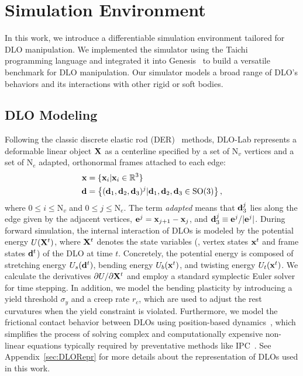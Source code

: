\section{Simulation Environment}
In this work, we introduce a differentiable simulation environment tailored for DLO manipulation. We implemented the simulator using the Taichi~\citep{hu2019taichi,hu2020difftaichi} programming language and integrated it into Genesis~\citep{Genesis} to build a versatile benchmark for DLO manipulation. Our simulator models a broad range of DLO's behaviors and its interactions with other rigid or soft bodies.

\subsection{DLO Modeling}
Following the classic discrete elastic rod (DER)~\citep{bergou2008discrete, bergou2010discrete} methods, DLO-Lab represents a deformable linear object ${\mathbf{X}}$ as a centerline specified by a set of $\text{N}_v$ vertices and a set of $\text{N}_e$ adapted, orthonormal frames attached to each edge:
\begin{align}
\begin{split}
    {\mathbf{x}} &= \{{\mathbf{x}}_i|{\mathbf{x}}_i\in{\mathbb{R}}^3\}\\
    {\mathbf{d}} &= 
    \left\{({\mathbf{d}}_1, {\mathbf{d}}_2, {\mathbf{d}}_3)^j| {\mathbf{d}}_1, {\mathbf{d}}_2, {\mathbf{d}}_3 \in \mathrm{SO(3)}\right\},
\end{split}
\end{align}
where $0\leq i\leq \text{N}_v$ and $0 \leq j \leq \text{N}_e$. The term \emph{adapted} means that ${\mathbf{d}}^j_3$ lies along the edge given by the adjacent vertices, ${\mathbf{e}}^j={\mathbf{x}}_{j+1}-{\mathbf{x}}_j$, and ${\mathbf{d}}^j_3\equiv{\mathbf{e}}^j/|{\mathbf{e}}^j|$.
During forward simulation, the internal interaction of DLOs is modeled by the potential energy $U({\mathbf{X}}^t)$, where ${\mathbf{X}}^t$ denotes the state variables (\ie, vertex states ${\mathbf{x}}^t$ and frame states ${\mathbf{d}}^t$) of the DLO at time $t$. Concretely, the potential energy is composed of stretching energy $U_s({\mathbf{d}}^t)$, bending energy $U_b({\mathbf{x}}^t)$, and twisting energy $U_t({\mathbf{x}}^t)$. We calculate the derivatives $\partial U/\partial {\mathbf{X}}^t$ and employ a standard symplectic Euler solver for time stepping. In addition, we model the bending plasticity by introducing a yield threshold $\sigma_y$ and a creep rate $r_c$, which are used to adjust the rest curvatures when the yield constraint is violated. Furthermore, we model the frictional contact behavior between DLOs using position-based dynamics~\citep{muller2007position}, which simplifies the process of solving complex and computationally expensive non-linear equations typically required by preventative methods like IPC~\citep{li2020incremental,li2021codimensional}. See Appendix~\ref{sec:DLORepr} for more details about the representation of DLOs used in this work.


